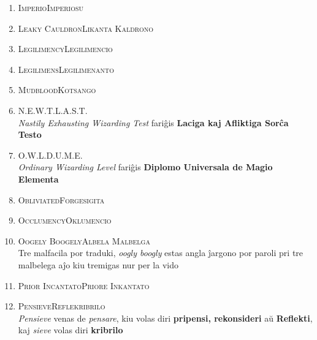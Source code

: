 \begin{enumerate}
\smallskip
\item\label{nomoj:imperiosu} \textsc{Imperio}\dotfill \textsc{Imperiosu}\\
\smallskip
\item\label{nomoj:kaldrono} \textsc{Leaky Cauldron}\dotfill \textsc{Likanta Kaldrono}\\
\smallskip
\item\label{nomoj:legilimencio} \textsc{Legilimency}\dotfill \textsc{Legilimencio}\\
\smallskip
\item\label{nomoj:legilimenanto} \textsc{Legilimens}\dotfill \textsc{Legilimenanto}\\
\smallskip
\item\label{nomoj:kotsango} \textsc{Mudblood}\dotfill \textsc{Kotsango}\\
\smallskip
\item\label{nomoj:last} \textsc{N.E.W.T.}\dotfill \textsc{L.A.S.T.}\\
{\footnotesize \indent \emph{Nastily Exhausting Wizarding Test} fariĝis \textbf{Laciga kaj Afliktiga Sorĉa Testo}}\\
\smallskip
\item\label{nomoj:dume} \textsc{O.W.L.}\dotfill \textsc{D.U.M.E.}\\
{\footnotesize \indent \emph{Ordinary Wizarding Level} fariĝis \textbf{Diplomo Universala de Magio Elementa}}\\
\smallskip
\item\label{nomoj:forgesigita} \textsc{Obliviated}\dotfill \textsc{Forgesigita}\\
\smallskip
\item\label{nomoj:oklumencio} \textsc{Occlumency}\dotfill \textsc{Oklumencio}\\
\smallskip
\item\label{nomoj:malbelga} \textsc{Oogely Boogely}\dotfill \textsc{Albela Malbelga}\\
{\footnotesize \indent Tre malfacila por traduki, \emph{oogly boogly} estas angla ĵargono por paroli pri tre malbelega aĵo kiu tremigas nur per la vido}\\
\smallskip
\item\label{nomoj:priorinkantato} \textsc{Prior Incantato}\dotfill \textsc{Priore Inkantato}\\
\smallskip
\item\label{nomoj:reflekribrilo} \textsc{Pensieve}\dotfill \textsc{Reflekribrilo}\\
{\footnotesize \indent \emph{Pensieve} venas de \emph{pensare}, kiu volas diri \textbf{pripensi, rekonsideri} aŭ \textbf{Reflekti}, kaj \emph{sieve} volas diri \textbf{kribrilo}}\\

\end{enumerate}

